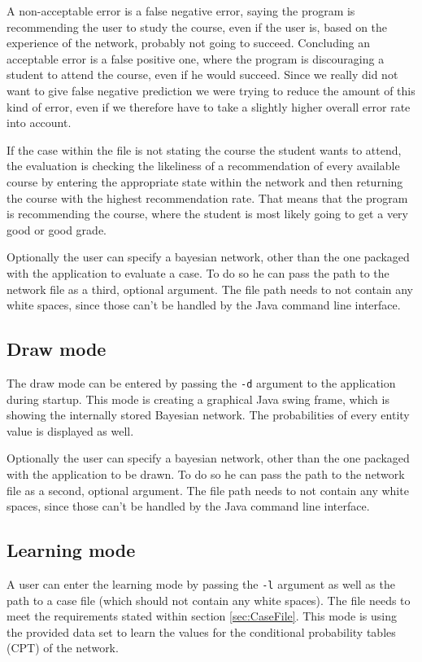 \documentclass[%
	pdftex,
	oneside,        %
	11pt,           %
	parskip=half,   %
	headsepline,    %
	footsepline,    %
	abstracton,     %
	USenglish,      %
	a4paper,        %
]{report}
\begin{document}
A non-acceptable error is a false negative error, saying the program is recommending the user to study the course, even if the user is, based on the experience of the network, probably not going to succeed. Concluding an acceptable error is a false positive one, where the program is discouraging a student to attend the course, even if he would succeed. Since we really did not want to give false negative prediction we were trying to reduce the amount of this kind of error, even if we therefore have to take a slightly higher overall error rate into account.

If the case within the file is not stating the course the student wants to attend, the evaluation is checking the likeliness of a recommendation of every available course by entering the appropriate state within the network and then returning the course with the highest recommendation rate. That means that the program is recommending the course, where the student is most likely going to get a very good or good grade.

Optionally the user can specify a bayesian network, other than the one packaged with the application to evaluate a case. To do so he can pass the path to the network file as a third, optional argument. The file path needs to not contain any white spaces, since those can't be handled by the Java command line interface.

\subsection{Draw mode}
The draw mode can be entered by passing the \texttt{-d} argument to the application during startup. This mode is creating a graphical Java swing frame, which is showing the internally stored Bayesian network. The probabilities of every entity value is displayed as well.

Optionally the user can specify a bayesian network, other than the one packaged with the application to be drawn. To do so he can pass the path to the network file as a second, optional argument. The file path needs to not contain any white spaces, since those can't be handled by the Java command line interface.

\subsection{Learning mode}
A user can enter the learning mode by passing the \texttt{-l} argument as well as the path to a case file (which should not contain any white spaces). The file needs to meet the requirements stated within section \vref{sec:CaseFile}. This mode is using the provided data set to learn the values for the conditional probability tables (CPT) of the network.
\end{document}
